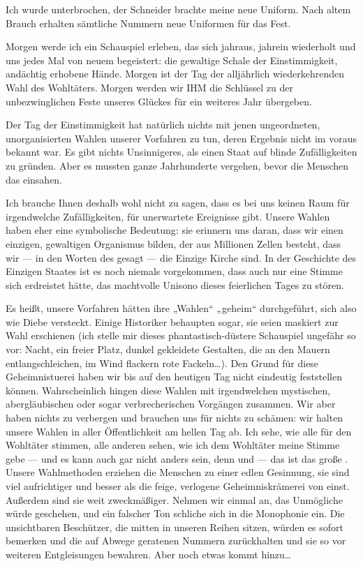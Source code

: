 Ich wurde unterbrochen, der Schneider brachte meine neue
Uniform. Nach altem Brauch erhalten sämtliche Nummern neue
Uniformen für das Fest.

Morgen werde ich ein Schauspiel erleben,
das sich jahraus, jahrein wiederholt und uns jedes Mal von neuem
begeistert: die gewaltige Schale der Einstimmigkeit, andächtig
erhobene Hände. Morgen ist der Tag der alljährlich wiederkehrenden
Wahl des Wohltäters. Morgen werden wir IHM die Schlüssel zu der
unbezwinglichen Feste unseres Glückes für ein weiteres Jahr
übergeben.

Der Tag der Einstimmigkeit hat natürlich nichts mit
jenen ungeordneten, unorganisierten Wahlen unserer Vorfahren zu
tun, deren Ergebnis nicht im voraus bekannt war. Es gibt nichts
Unsinnigeres, als einen Staat auf blinde Zufälligkeiten zu gründen.
Aber es mussten ganze Jahrhunderte vergehen, bevor die Menschen das
einsahen.

Ich brauche Ihnen deshalb wohl nicht zu sagen, dass es
bei uns keinen Raum für irgendwelche Zufälligkeiten, für
unerwartete Ereignisse gibt. Unsere Wahlen haben eher eine
symbolische Bedeutung: sie erinnern uns daran, dass wir einen
einzigen, gewaltigen Organismus bilden, der aus Millionen Zellen
besteht, dass wir — in den Worten des  gesagt — die
Einzige Kirche sind. In der Geschichte des Einzigen Staates ist es
noch niemals vorgekommen, dass auch nur eine Stimme sich erdreistet
hätte, das machtvolle Unisono dieses feierlichen Tages zu stören.

Es heißt, unsere Vorfahren hätten ihre „Wahlen“ „geheim“
durchgeführt, sich also wie Diebe versteckt. Einige Historiker
behaupten sogar, sie seien maskiert zur Wahl erschienen (ich stelle
mir dieses phantastisch-düstere Schauspiel ungefähr so vor: Nacht,
ein freier Platz, dunkel gekleidete Gestalten, die an den Mauern
entlangschleichen, im Wind flackern rote Fackeln\ldots{}). Den Grund für
diese Geheimnistuerei haben wir bis auf den heutigen Tag nicht
eindeutig feststellen können. Wahrscheinlich hingen diese Wahlen
mit irgendwelchen mystischen, abergläubischen oder sogar
verbrecherischen Vorgängen zusammen. Wir aber haben nichts zu
verbergen und brauchen uns für nichts zu schämen: wir halten unsere
Wahlen in aller Öffentlichkeit am hellen Tag ab. Ich sehe, wie alle
für den Wohltäter stimmen, alle anderen sehen, wie ich dem
Wohltäter meine Stimme gebe — und es kann auch gar nicht anders
sein, denn  und  — das ist das große . Unsere
Wahlmethoden erziehen die Menschen zu einer edlen Gesinnung, sie
sind viel aufrichtiger und besser als die feige, verlogene
Geheimniskrämerei von einst. Außerdem sind sie weit zweckmäßiger.
Nehmen wir einmal an, das Unmögliche würde geschehen, und ein
falscher Ton schliche sich in die Monophonie ein. Die unsichtbaren
Beschützer, die mitten in unseren Reihen sitzen, würden
es sofort bemerken und die auf Abwege geratenen Nummern
zurückhalten und sie so vor weiteren Entgleisungen bewahren. Aber
noch etwas kommt hinzu\ldots{}


